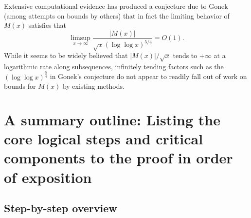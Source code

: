 \documentclass[11pt,reqno,a4letter]{article}
\numberwithin{figure}{section}
\numberwithin{table}{section}
\theoremstyle{plain}
\numberwithin{theorem}{section}
\theoremstyle{definition}
\begin{document}
Extensive computational evidence has produced 
a conjecture due to Gonek (among attempts on bounds by others) that in fact the limiting behavior of 
$M(x)$ satisfies 
that $$\limsup_{x \rightarrow \infty} \frac{|M(x)|}{\sqrt{x} 
(\log\log x)^{5/4}} = O(1).$$ 
While it seems to be widely believed that $|M(x)| / \sqrt{x}$ tends to $+\infty$ at a logarithmic rate 
along subsequences, infinitely tending factors such as the $(\log\log x)^{\frac{5}{4}}$ in Gonek's conjecture 
do not appear to readily fall out of work on bounds for $M(x)$ by existing methods. 

\newpage
\section{A summary outline: Listing the core logical steps and critical components to the proof in order of exposition} 

\subsection{Step-by-step overview} 
\end{document}
